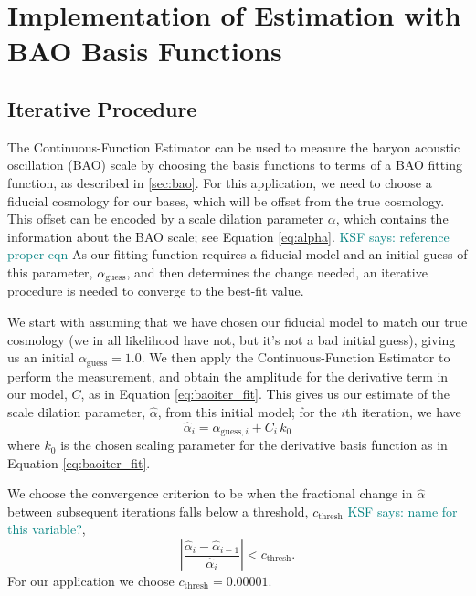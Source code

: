 \documentclass[modern]{aastex62}
\newcommand{\Est}{The Continuous-Function Estimator\xspace}
\newcommand{\est}{the Continuous-Function Estimator\xspace}
\newcommand{\KSF}[1]{\textcolor{teal}{KSF says: #1}}
\begin{document}
\section{Implementation of Estimation with BAO Basis Functions}\label{sec:baoiter}

\subsection{Iterative Procedure}
\Est can be used to measure the baryon acoustic oscillation (BAO) scale by choosing the basis functions to terms of a BAO fitting function, as described in \ref{sec:bao}.
For this application, we need to choose a fiducial cosmology for our bases, which will be offset from the true cosmology.
This offset can be encoded by a scale dilation parameter $\alpha$, which contains the information about the BAO scale; see Equation \ref{eq:alpha}. \KSF{reference proper eqn}
As our fitting function requires a fiducial model and an initial guess of this parameter, $\alpha_\mathrm{guess}$, and then determines the change needed, an iterative procedure is needed to converge to the best-fit value.

We start with assuming that we have chosen our fiducial model to match our true cosmology (we in all likelihood have not, but it's not a bad initial guess), giving us an initial $\alpha_\mathrm{guess} = 1.0$. 
We then apply \est to perform the measurement, and obtain the amplitude for the derivative term in our model, $C$, as in Equation \ref{eq:baoiter_fit}. 
This gives us our estimate of the scale dilation parameter, $\hat{\alpha}$, from this initial model; for the $i$th iteration, we have
\begin{equation}
    \hat{\alpha}_{i} = \alpha_{\mathrm{guess},i} + C_i \, k_0
\end{equation}
where $k_0$ is the chosen scaling parameter for the derivative basis function as in Equation \ref{eq:baoiter_fit}.

We choose the convergence criterion to be when the fractional change in $\hat{\alpha}$ between subsequent iterations falls below a threshold, $c_\mathrm{thresh}$ \KSF{name for this variable?},
\begin{equation}
    \left| \frac{\hat{\alpha}_i - \hat{\alpha}_{i-1}}{\hat{\alpha}_i} \right| < c_\mathrm{thresh}.
\end{equation}
For our application we choose $c_\mathrm{thresh} = 0.00001$.
\end{document}
